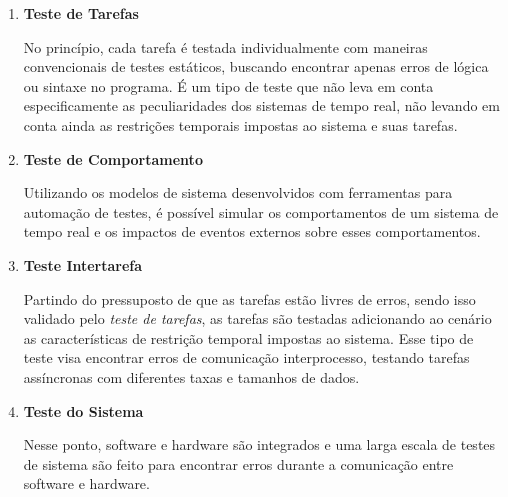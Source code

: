 \begin{enumerate}
\item \textbf{Teste de Tarefas}

No princípio, cada tarefa é testada individualmente com maneiras convencionais de testes estáticos, buscando encontrar
apenas erros de lógica ou sintaxe no programa. É um tipo de teste que não leva em conta especificamente as peculiaridades
dos sistemas de tempo real, não levando em conta ainda as restrições temporais impostas ao sistema e suas tarefas.


\item \textbf{Teste de Comportamento}

Utilizando os modelos de sistema desenvolvidos com ferramentas para automação de testes, é possível simular os comportamentos
de um sistema de tempo real e os impactos de eventos externos sobre esses comportamentos.


\item \textbf{Teste Intertarefa}

Partindo do pressuposto de que as tarefas estão livres de erros, sendo isso validado pelo \textit{teste de tarefas}, as tarefas são
testadas adicionando ao cenário as características de restrição temporal impostas ao sistema. Esse tipo de teste visa encontrar
erros de comunicação interprocesso, testando tarefas assíncronas com diferentes taxas e tamanhos de dados.


\item \textbf{Teste do Sistema}

Nesse ponto, software e hardware são integrados e uma larga escala de testes de sistema são feito para encontrar erros durante
a comunicação entre software e hardware.

\end{enumerate}
